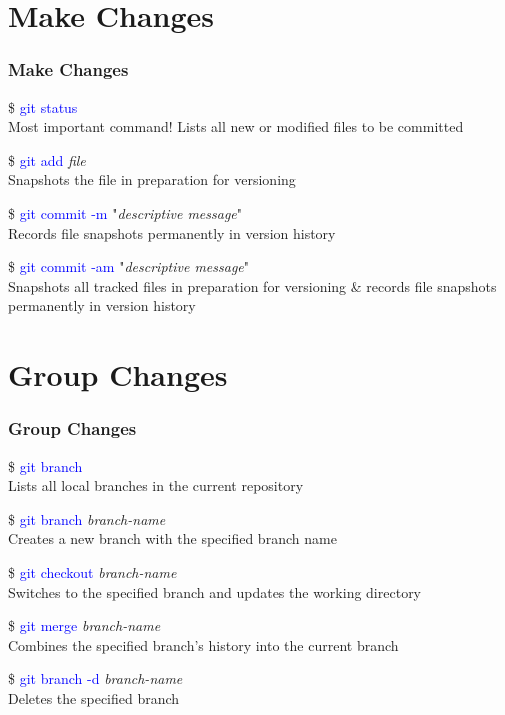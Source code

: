 \documentclass[aspectratio=169]{beamer}
\begin{document}
\section{Make Changes}
\begin{frame}
  
\frametitle{Make Changes}

\$ \textcolor{blue}{git status}\\
Most important command! Lists all new or modified files to be committed

\pause

\$ \textcolor{blue}{git add} \textit{file}\\
Snapshots the file in preparation for versioning

\pause

\$ \textcolor{blue}{git commit -m} "\textit{descriptive message}"\\
Records file snapshots permanently in version history

\pause

\$ \textcolor{blue}{git commit -am} "\textit{descriptive message}"\\
Snapshots all tracked files in preparation for versioning \& records file snapshots permanently in version history

\end{frame}

\section{Group Changes}
\begin{frame}

\frametitle{Group Changes}

\$ \textcolor{blue}{git branch}\\
Lists all local branches in the current repository

\pause

\$ \textcolor{blue}{git branch} \textit{branch-name}\\
Creates a new branch with the specified branch name

\pause

\$ \textcolor{blue}{git checkout} \textit{branch-name}\\
Switches to the specified branch and updates the working directory

\pause

\$ \textcolor{blue}{git merge} \textit{branch-name}\\
Combines the specified branch's history into the current branch

\pause

\$ \textcolor{blue}{git branch -d} \textit{branch-name}\\
Deletes the specified branch

\end{frame}
\end{document}
